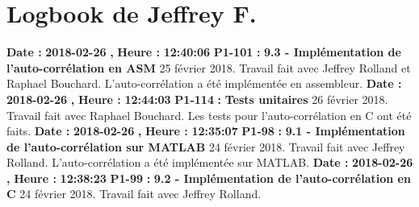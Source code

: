 \documentclass{article}%
\begin{document}
\section{Logbook de Jeffrey F.}%
\textbf{Date : }%
\textbf{2018{-}02{-}26}%
\textbf{,}%
\textbf{ Heure : }%
\textbf{12:40:06}%
\newline%
%
\textbf{P1{-}101 }%
\textbf{ : }%
\textbf{ 9.3 {-} Implémentation de l'auto{-}corrélation en ASM}%
\newline%
\newline%
%
25 février 2018.\newline%
Travail fait avec Jeffrey Rolland et Raphael Bouchard.\newline%
L'auto{-}corrélation a été implémentée en assembleur.\newline%
\newline%
%
\textbf{Date : }%
\textbf{2018{-}02{-}26}%
\textbf{,}%
\textbf{ Heure : }%
\textbf{12:44:03}%
\newline%
%
\textbf{P1{-}114 }%
\textbf{ : }%
\textbf{ Tests unitaires}%
\newline%
\newline%
%
26 février 2018.\newline%
Travail fait avec Raphael Bouchard.\newline%
Les tests pour l'auto{-}corrélation en C ont été faits.\newline%
\newline%
%
\textbf{Date : }%
\textbf{2018{-}02{-}26}%
\textbf{,}%
\textbf{ Heure : }%
\textbf{12:35:07}%
\newline%
%
\textbf{P1{-}98 }%
\textbf{ : }%
\textbf{ 9.1 {-} Implémentation de l'auto{-}corrélation sur MATLAB}%
\newline%
\newline%
%
24 février 2018.\newline%
Travail fait avec Jeffrey Rolland.\newline%
L'auto{-}corrélation a été implémentée sur MATLAB.\newline%
\newline%
%
\textbf{Date : }%
\textbf{2018{-}02{-}26}%
\textbf{,}%
\textbf{ Heure : }%
\textbf{12:38:23}%
\newline%
%
\textbf{P1{-}99 }%
\textbf{ : }%
\textbf{ 9.2 {-} Implémentation de l'auto{-}corrélation en C}%
\newline%
\newline%
%
24 février 2018.\newline%
Travail fait avec Jeffrey Rolland.\newline%
\end{document}
